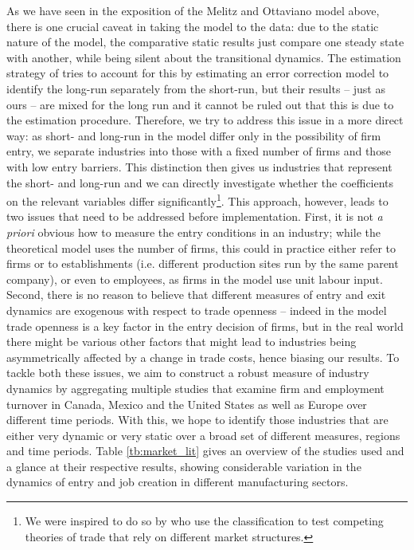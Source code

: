 As we have seen in the exposition of the Melitz and Ottaviano model above, there is one crucial caveat in taking the model to the data: due to the static nature of the model, the comparative static results just compare one steady state with another, while being silent about the transitional dynamics. The estimation strategy of \citet{Chen2009} tries to account for this by estimating an error correction model to identify the long-run separately from the short-run, but their results -- just as ours -- are mixed for the long run and it cannot be ruled out that this is due to the estimation procedure. Therefore, we try to address this issue in a more direct way: as short- and long-run in the model differ only in the possibility of firm entry, we separate industries into those with a fixed number of firms and those with low entry barriers. This distinction then gives us industries that represent the short- and long-run and we can directly investigate whether the coefficients on the relevant variables differ significantly\footnote{We were inspired to do so by \citet{Head1999} who use the classification to test competing theories of trade that rely on different market structures.}. This approach, however, leads to two issues that need to be addressed before implementation. First, it is not \textit{a priori} obvious how to measure the entry conditions in an industry; while the theoretical model uses the number of firms, this could in practice either refer to firms or to establishments (i.e. different production sites run by the same parent company), or even to employees, as firms in the model use unit labour input. Second, there is no reason to believe that different measures of entry and exit dynamics are exogenous with respect to trade openness -- indeed in the model trade openness is a key factor in the entry decision of firms, but in the real world there might be various other factors that might lead to industries being asymmetrically affected by a change in trade costs, hence biasing our results. To tackle both these issues, we aim to construct a robust measure of industry dynamics by aggregating multiple studies that examine firm and employment turnover in Canada, Mexico and the United States as well as Europe over different time periods. With this, we hope to identify those industries that are either very dynamic or very static over a broad set of different measures, regions and time periods. Table \ref{tb:market_lit} gives an overview of the studies used and a glance at their respective results, showing considerable variation in the dynamics of entry and job creation in different manufacturing sectors.
 
